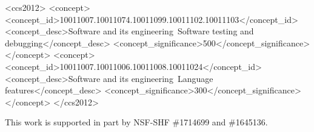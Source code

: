 \documentclass[sigconf,screen]{acmart}
\begin{document}
\begin{CCSXML}
<ccs2012>
<concept>
<concept_id>10011007.10011074.10011099.10011102.10011103</concept_id>
<concept_desc>Software and its engineering~Software testing and debugging</concept_desc>
<concept_significance>500</concept_significance>
</concept>
<concept>
<concept_id>10011007.10011006.10011008.10011024</concept_id>
<concept_desc>Software and its engineering~Language features</concept_desc>
<concept_significance>300</concept_significance>
</concept>
</ccs2012>
\end{CCSXML}




\maketitle



%
%
%


%




\begin{acks}
This work is supported in part by NSF-SHF \#1714699 and \#1645136. 
\end{acks}

\balance


%

%
\end{document}
